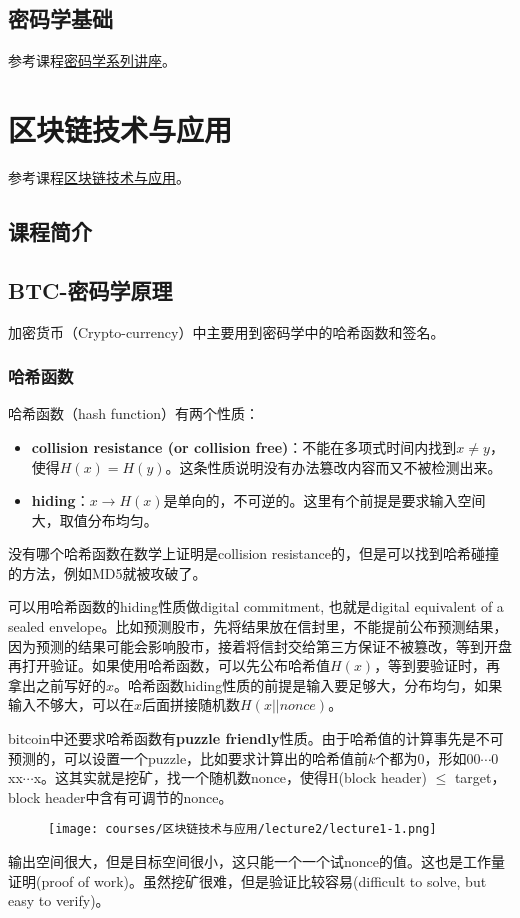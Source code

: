 \documentclass[10pt]{ctexart}
\begin{document}
\subsection{密码学基础}
参考课程\href{https://www.bilibili.com/video/BV18T411k74f/?spm_id_from=333.788&vd_source=c6586ed2410fae637f393017e00f4845}{密码学系列讲座}。
\section{区块链技术与应用}
参考课程\href{http://zhenxiao.com/blockchain/}{区块链技术与应用}。
\subsection{课程简介}
 
\subsection{BTC-密码学原理}
加密货币（Crypto-currency）中主要用到密码学中的哈希函数和签名。
\subsubsection{哈希函数}
哈希函数（hash function）有两个性质：
\begin{itemize}
    \item \textbf{collision resistance (or collision free)}：不能在多项式时间内找到$x \neq y$，使得$H(x)=H(y)$。这条性质说明没有办法篡改内容而又不被检测出来。
    \item \textbf{hiding}：$x \rightarrow H(x)$是单向的，不可逆的。这里有个前提是要求输入空间大，取值分布均匀。
\end{itemize}
没有哪个哈希函数在数学上证明是collision resistance的，但是可以找到哈希碰撞的方法，例如MD5就被攻破了。

可以用哈希函数的hiding性质做digital commitment, 也就是digital equivalent of a sealed envelope。比如预测股市，先将结果放在信封里，不能提前公布预测结果，因为预测的结果可能会影响股市，接着将信封交给第三方保证不被篡改，等到开盘再打开验证。如果使用哈希函数，可以先公布哈希值$H(x)$，等到要验证时，再拿出之前写好的$x$。哈希函数hiding性质的前提是输入要足够大，分布均匀，如果输入不够大，可以在$x$后面拼接随机数$H(x||nonce)$。

bitcoin中还要求哈希函数有\textbf{puzzle friendly}性质。由于哈希值的计算事先是不可预测的，可以设置一个puzzle，比如要求计算出的哈希值前$k$个都为0，形如$00\cdots 0 $xx$\cdots$x。这其实就是挖矿，找一个随机数nonce，使得H(block header) $\le$ target，block header中含有可调节的nonce。
\begin{figure}[H]
    \centering
    \texttt{[image: courses/区块链技术与应用/lecture2/lecture1-1.png]} 
\end{figure}
输出空间很大，但是目标空间很小，这只能一个一个试nonce的值。这也是工作量证明(proof of work)。虽然挖矿很难，但是验证比较容易(difficult to solve, but easy to verify)。
\end{document}
